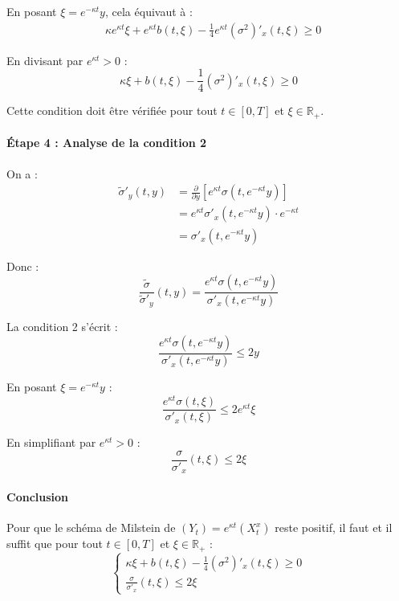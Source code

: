 \documentclass[12pt,a4paper]{article}
\theoremstyle{definition}
\theoremstyle{remark}
\newcommand{\R}{\mathbb{R}}
\begin{document}
En posant $\xi = e^{-\kappa t}y$, cela équivaut à :
\begin{align*}
&\kappa e^{\kappa t}\xi + e^{\kappa t}b(t,\xi) - \frac{1}{4}e^{\kappa t}(\sigma^2)'_x(t,\xi) \geq 0
\end{align*}

En divisant par $e^{\kappa t} > 0$ :
\begin{equation}
\boxed{\kappa \xi + b(t,\xi) - \frac{1}{4}(\sigma^2)'_x(t,\xi) \geq 0}
\end{equation}

Cette condition doit être vérifiée pour tout $t \in [0,T]$ et $\xi \in \R_+$.

\paragraph{Étape 4 : Analyse de la condition 2}
On a :
\begin{align*}
\tilde{\sigma}'_y(t,y) &= \frac{\partial}{\partial y}[e^{\kappa t}\sigma(t, e^{-\kappa t}y)] \\
&= e^{\kappa t}\sigma'_x(t, e^{-\kappa t}y) \cdot e^{-\kappa t} \\
&= \sigma'_x(t, e^{-\kappa t}y)
\end{align*}

Donc :
\[
\frac{\tilde{\sigma}}{\tilde{\sigma}'_y}(t,y) = \frac{e^{\kappa t}\sigma(t, e^{-\kappa t}y)}{\sigma'_x(t, e^{-\kappa t}y)}
\]

La condition 2 s'écrit :
\[
\frac{e^{\kappa t}\sigma(t, e^{-\kappa t}y)}{\sigma'_x(t, e^{-\kappa t}y)} \leq 2y
\]

En posant $\xi = e^{-\kappa t}y$ :
\[
\frac{e^{\kappa t}\sigma(t,\xi)}{\sigma'_x(t,\xi)} \leq 2e^{\kappa t}\xi
\]

En simplifiant par $e^{\kappa t} > 0$ :
\begin{equation}
\boxed{\frac{\sigma}{\sigma'_x}(t,\xi) \leq 2\xi}
\end{equation}

\paragraph{Conclusion}
Pour que le schéma de Milstein de $(Y_t) = e^{\kappa t}(X_t^x)$ reste positif, il faut et il suffit que pour tout $t \in [0,T]$ et $\xi \in \R_+$ :
\begin{equation}
\begin{cases}
\kappa \xi + b(t,\xi) - \frac{1}{4}(\sigma^2)'_x(t,\xi) \geq 0 \\
\frac{\sigma}{\sigma'_x}(t,\xi) \leq 2\xi
\end{cases}
\end{equation}
\end{document}
